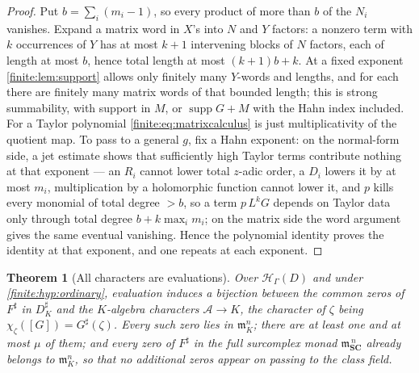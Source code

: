 \documentclass[11pt,letterpaper]{article}
\newtheorem{theorem}{Theorem}[section]
\theoremstyle{definition}
\theoremstyle{remark}
\newcommand{\SC}{\mathbf{SC}}
\newcommand{\HH}{\mathscr H}
\newcommand{\Alg}{\mathcal A}
\newcommand{\mm}{\mathfrak m}
\newcommand{\sh}{^{\sharp}}
\DeclareMathOperator{\supp}{supp}
\numberwithin{equation}{section}
\begin{document}
\begin{proof}
Put $b=\sum_i(m_i-1)$, so every product of more than $b$ of the $N_i$ vanishes. Expand a matrix word in $X$'s into $N$ and $Y$ factors: a nonzero term with $k$ occurrences of $Y$ has at most $k+1$ intervening blocks of $N$ factors, each of length at most $b$, hence total length at most $(k+1)b+k$. At a fixed exponent \cref{finite:lem:support} allows only finitely many $Y$-words and lengths, and for each there are finitely many matrix words of that bounded length; this is strong summability, with support in $M$, or $\supp G+M$ with the Hahn index included. For a Taylor polynomial \eqref{finite:eq:matrixcalculus} is just multiplicativity of the quotient map. To pass to a general $g$, fix a Hahn exponent: on the normal-form side, a jet estimate shows that sufficiently high Taylor terms contribute nothing at that exponent --- an $R_i$ cannot lower total $z$-adic order, a $D_i$ lowers it by at most $m_i$, multiplication by a holomorphic function cannot lower it, and $p$ kills every monomial of total degree $>b$, so a term $p\,L^kG$ depends on Taylor data only through total degree $b+k\max_im_i$; on the matrix side the word argument gives the same eventual vanishing. Hence the polynomial identity proves the identity at that exponent, and one repeats at each exponent.
\end{proof}

\begin{theorem}[All characters are evaluations]
\label{finite:thm:characters}
Over $\HH_\Gamma(D)$ and under \cref{finite:hyp:ordinary}, evaluation induces a bijection between the common zeros of $F\sh$ in $D\sh_K$ and the $K$-algebra characters $\Alg\to K$, the character of $\zeta$ being $\chi_\zeta([G])=G\sh(\zeta)$. Every such zero lies in $\mm_K^n$; there are at least one and at most $\mu$ of them; and every zero of $F\sh$ in the full surcomplex monad $\mm_{\SC}^{\,n}$ already belongs to $\mm_K^n$, so that no additional zeros appear on passing to the class field.
\end{theorem}
\end{document}
